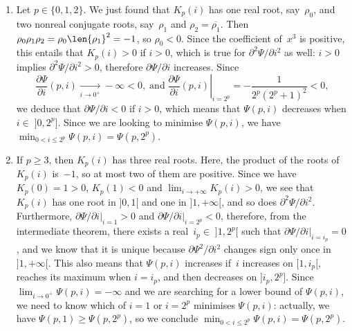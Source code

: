 \begin{enumerate}

  \item Let \(p \in \{0,1,2\}\). We just found that \(K_p(i)\) has one
    real root, say~\(\rho_0\), and two nonreal conjugate roots,
    say~\(\rho_1\) and \(\rho_2=\overline{\rho_1}\). Then
    \(\rho_0\rho_1\rho_2 = \rho_0 \len{\rho_1}^2 = -1\), so \(\rho_0 <
    0\). Since the coefficient of~\(x^3\) is positive, this entails
    that \(K_p(i) > 0\) if \(i > 0\), which is true for
    \(\partial^2\Psi/\partial i^2\) as well: \(i > 0 \) implies
    \(\partial^2\Psi/\partial i^2 > 0\), therefore
    \(\partial\Psi/\partial i\) increases. Since
  \begin{equation*}
    \frac{\partial\Psi}{\partial i}(p,i) \xrightarrow[i\to 0^{+}]{}
    -\infty < 0, \;\text{and}\; \left.\frac{\partial\Psi}{\partial
        i}(p,i)\right|_{i=2^p} = -\frac{1}{2^p(2^p+1)^2} < 0,
  \end{equation*}
  we deduce that \(\partial\Psi/\partial i < 0\) if \(i > 0\), which
  means that \(\Psi(p,i)\) decreases when \(i \in\; ]0,2^p]\). Since
  we are looking to minimise \(\Psi(p,i)\), we have \(\min_{0 < i
    \leqslant 2^p}\Psi(p,i) = \Psi(p,2^p)\).

\item If \(p \geqslant 3\), then \(K_p(i)\) has three real
  roots. Here, the product of the roots of \(K_p(i)\) is~\(-1\), so at
  most two of them are positive. Since we have \(K_p(0) = 1 > 0\),
  \(K_p(1) < 0\) and \(\lim_{i\to+\infty}K_p(i) > 0\), we see that
  \(K_p(i)\) has one root in \(]0,1[\) and one in \(]1,+\infty[\), and
  so does \(\partial^2\Psi/\partial i^2\). Furthermore,
  \(\left.\partial\Psi/\partial i\right|_{i=1} > 0\) and
  \(\left.\partial\Psi/\partial i\right|_{i=2^p} < 0\), therefore,
  from the intermediate theorem, there exists a real~\(i_p \in\;
  ]1,2^p[\) such that \(\left.\partial\Psi/\partial i\right|_{i=i_p} =
  0\), and we know that it is unique because \(\partial\Psi^2/\partial
  i^2\) changes sign only once in \(]1,+\infty[\). This also means
  that \(\Psi(p,i)\) increases if~\(i\) increases on \([1,i_p[\),
  reaches its maximum when \(i=i_p\), and then decreases on
  \(]i_p,2^p]\). Since \(\lim_{i \to 0^{+}}\Psi(p,i) = -\infty\) and
  we are searching for a lower bound of \(\Psi(p,i)\), we need to know
  which of \(i=1\) or \(i=2^p\) minimises \(\Psi(p,i)\): actually, we
  have \(\Psi(p,1) \geqslant \Psi(p,2^p)\), so we conclude \(\min_{0 <
    i \leqslant 2^p}\Psi(p,i) = \Psi(p,2^p)\).
\end{enumerate}
